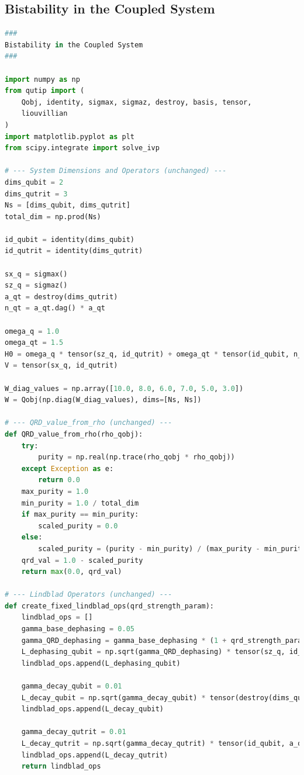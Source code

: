 \documentclass[9pt]{article}
\begin{document}
\subsection{Bistability in the Coupled System}
\begin{lstlisting}[language=Python, basicstyle=\ttfamily\footnotesize, breaklines=true, frame=single, caption={Python Code for Bistability in the Coupled System}, label={lst:qrd_code}]
###
Bistability in the Coupled System
###

import numpy as np
from qutip import (
    Qobj, identity, sigmax, sigmaz, destroy, basis, tensor,
    liouvillian
)
import matplotlib.pyplot as plt
from scipy.integrate import solve_ivp

# --- System Dimensions and Operators (unchanged) ---
dims_qubit = 2
dims_qutrit = 3
Ns = [dims_qubit, dims_qutrit]
total_dim = np.prod(Ns)

id_qubit = identity(dims_qubit)
id_qutrit = identity(dims_qutrit)

sx_q = sigmax()
sz_q = sigmaz()
a_qt = destroy(dims_qutrit)
n_qt = a_qt.dag() * a_qt

omega_q = 1.0
omega_qt = 1.5
H0 = omega_q * tensor(sz_q, id_qutrit) + omega_qt * tensor(id_qubit, n_qt)
V = tensor(sx_q, id_qutrit)

W_diag_values = np.array([10.0, 8.0, 6.0, 7.0, 5.0, 3.0])
W = Qobj(np.diag(W_diag_values), dims=[Ns, Ns])

# --- QRD_value_from_rho (unchanged) ---
def QRD_value_from_rho(rho_qobj):
    try:
        purity = np.real(np.trace(rho_qobj * rho_qobj))
    except Exception as e:
        return 0.0
    max_purity = 1.0
    min_purity = 1.0 / total_dim
    if max_purity == min_purity:
        scaled_purity = 0.0
    else:
        scaled_purity = (purity - min_purity) / (max_purity - min_purity)
    qrd_val = 1.0 - scaled_purity
    return max(0.0, qrd_val)

# --- Lindblad Operators (unchanged) ---
def create_fixed_lindblad_ops(qrd_strength_param):
    lindblad_ops = []
    gamma_base_dephasing = 0.05
    gamma_QRD_dephasing = gamma_base_dephasing * (1 + qrd_strength_param * 2.0)
    L_dephasing_qubit = np.sqrt(gamma_QRD_dephasing) * tensor(sz_q, id_qutrit)
    lindblad_ops.append(L_dephasing_qubit)

    gamma_decay_qubit = 0.01
    L_decay_qubit = np.sqrt(gamma_decay_qubit) * tensor(destroy(dims_qubit), id_qutrit)
    lindblad_ops.append(L_decay_qubit)

    gamma_decay_qutrit = 0.01
    L_decay_qutrit = np.sqrt(gamma_decay_qutrit) * tensor(id_qubit, a_qt)
    lindblad_ops.append(L_decay_qutrit)
    return lindblad_ops


\end{lstlisting}
\end{document}
